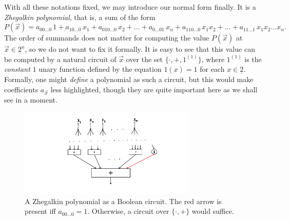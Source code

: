 \documentclass[12pt,notitlepage]{article}
\theoremstyle{plain}
\theoremstyle{definition}
\theoremstyle{plain}
\newcommand{\ul}[1]{\underline{#1}}
\newcommand{\1}{\mathbf{1}}
\newcommand{\0}{\mathbf{0}}
\begin{document}
With all these notations fixed, we may introduce our normal form finally. It is a \emph{Zhegalkin polynomial}, that is, a sum of the form
$$P(\vec x) = a_{00\ldots0}\, 1 + a_{10\ldots0}\, x_1 + a_{010\ldots0}\, x_2 + \ldots + a_{0\ldots01}\, x_n + a_{110\ldots0}\, x_1 x_2 + \ldots + a_{11\ldots 1}\, x_1 x_2\ldots x_n.$$
The order of summands does not matter for computing the value $P(\vec x)$ at $\vec x \in \ul{2}^n$, so we do not want to fix it formally. It is easy to see that this value can be computed by a natural circuit of $\vec x$ over the set $\{ {\cdot}, {+}, 1^{(1)} \}$, where $1^{(1)}$ is the \emph{constant $1$} unary function defined by the equation $1(x) = 1$ for each $x \in \ul{2}$. Formally, one might \emph{define} a polynomial as such a circuit, but this would make coefficients $a_{\vec\sigma}$ less highlighted, though they are quite important here as we shall see in a moment.

\begin{figure}[h]
\centering
\includegraphics*[width=0.75\textwidth]{circuits_poly.pdf}
\caption{A Zhegalkin polynomial as a Boolean circuit. The red arrow is present iff $a_{00\ldots0} = 1$. Otherwise, a circuit over $\{{\cdot}, {+}\}$ would suffice.}
\end{figure}
\end{document}
